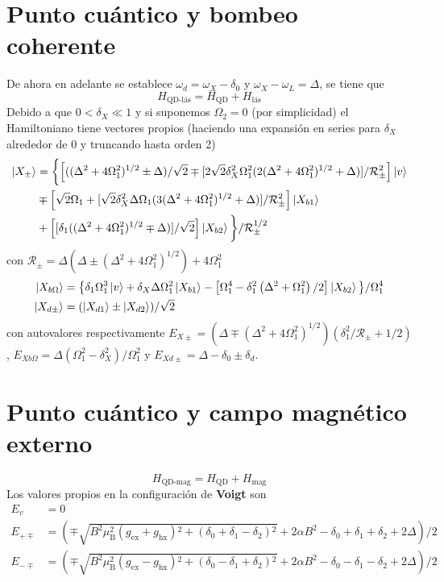 \documentclass[../main.tex]{subfiles}
\begin{document}
\section{Punto cuántico y bombeo coherente}
De ahora en adelante se establece $\omega_d = \omega_X - \delta_0$ y $\omega_X - \omega_L = \Delta$, se tiene que
$$H_\text{QD-l\'as} = H_\text{QD} + H_\text{l\'as}$$
Debido a que $0<\delta_X \ll 1$ y si suponemos $\Omega_2 = 0$ (por simplicidad) el Hamiltoniano tiene vectores propios (haciendo una expansión en series para $\delta_X$ alrededor de 0 y truncando hasta orden 2)
\begin{align*}
  \ket{X_\pm} &= \bigg\{\Big[((\Delta ^2+4 \Omega _1^2)^{1/2} \pm \Delta)/\sqrt{2} \mp [2 \sqrt{2} \delta_X^2 \Omega_1^2 (2(\Delta ^2+4 \Omega _1^2)^{1/2}+\Delta)]/\mathcal{R}_\pm^2\Big]\ket{v}\\ 
   &\mp \Big[\sqrt{2} \Omega_1 + [\sqrt{2} \delta_X^2 \Delta  \Omega _1 (3(\Delta ^2 + 4 \Omega_1^2)^{1/2}+\Delta)]/\mathcal{R}_\pm^2 \Big]\ket{X_{b1}}\\ 
   &+ \Big[[\delta _1 ((\Delta^2 + 4\Omega_1^2)^{1/2} \mp \Delta)]/\sqrt{2}\Big]\ket{X_{b2}} \bigg\}/\mathcal{R}_\pm^{1/2}
\end{align*}
con $\mathcal{R}_\pm = \Delta  (\Delta \pm (\Delta ^2+4 \Omega _1^2)^{1/2})+4 \Omega _1^2$
\begin{align*}
   \ket{X_{b\Omega}} &= \big\{ \delta _1 \Omega_1^3 \ket{v} + \delta_X \Delta \Omega_1^2 \ket{X_{b1}} - \big[\Omega_1^4 - \delta _1^2 \left(\Delta ^2+\Omega _1^2\right)/2 \big]\ket{X_{b2}} \big\} /\Omega_1^4\\
   \ket{X_{d\pm}} &= (\ket{X_{d1}} \pm \ket{X_{d2}})/\sqrt{2}
\end{align*}
con autovalores respectivamente $E_{X\pm} = (\Delta \mp (\Delta^2 + 4\Omega_1^2)^{1/2})(\delta _1^2/\mathcal{R}_\pm + 1/2)$, $E_{Xb\Omega} = \Delta(\Omega_1^2 - \delta_X^2)/\Omega_1^2$ y $E_{Xd\pm} = \Delta - \delta_0 \pm \delta_d$.
\section{Punto cuántico y campo magnético externo}
\begin{equation*}
    H_\text{QD-mag} = H_\text{QD} + H_\text{mag}
\end{equation*}
Los valores propios en la configuración de \textbf{Voigt} son
\begin{align*}
    E_v &= 0\\
    E_{+\mp} &= \left(\mp\sqrt{B^2 \mu _{\text{B}}^2 \left(g_{\text{ex}}+g_{\text{hx}}\right){}^2+\left(\delta _0+\delta _1-\delta _2\right){}^2}+2 \alpha  B^2-\delta _0+\delta _1+\delta _2+2 \Delta \right)/2\\
    E_{-\mp} &= \left(\mp\sqrt{B^2 \mu _{\text{B}}^2 \left(g_{\text{ex}}-g_{\text{hx}}\right){}^2+\left(\delta _0-\delta _1+\delta _2\right){}^2}+2 \alpha  B^2-\delta _0-\delta _1-\delta _2+2 \Delta \right)/2
\end{align*}
\end{document}
